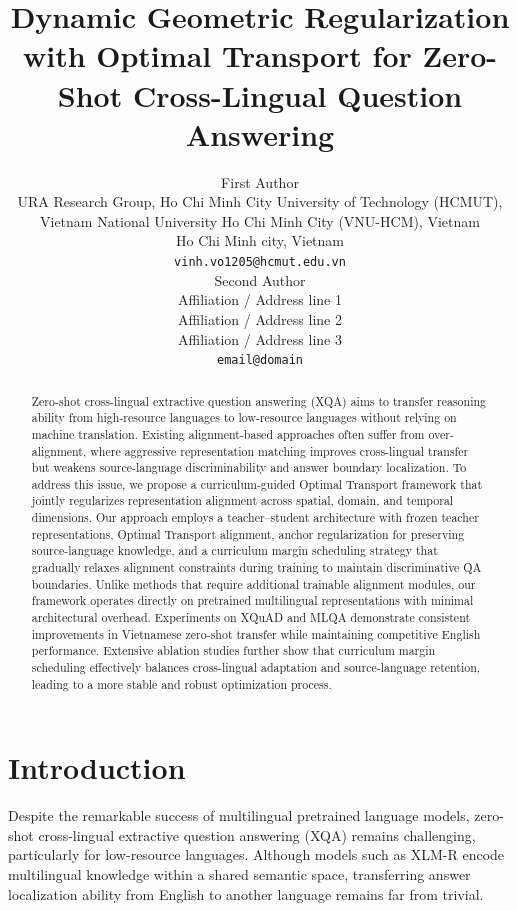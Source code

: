 \documentclass[11pt]{article}
\title{Dynamic Geometric Regularization with Optimal Transport for Zero-Shot Cross-Lingual Question Answering}
\author{First Author \\
  URA Research Group, Ho Chi Minh City University of Technology (HCMUT), Vietnam National University Ho Chi Minh City (VNU-HCM), Vietnam \\
  Ho Chi Minh city, Vietnam \\
  \texttt{vinh.vo1205@hcmut.edu.vn} \\\And
  Second Author \\
  Affiliation / Address line 1 \\
  Affiliation / Address line 2 \\
  Affiliation / Address line 3 \\
  \texttt{email@domain} \\}
\begin{document}
\maketitle
\begin{abstract}

Zero-shot cross-lingual extractive question answering (XQA) aims to transfer reasoning ability from high-resource languages to low-resource languages without relying on machine translation. Existing alignment-based approaches often suffer from over-alignment, where aggressive representation matching improves cross-lingual transfer but weakens source-language discriminability and answer boundary localization. To address this issue, we propose a curriculum-guided Optimal Transport framework that jointly regularizes representation alignment across spatial, domain, and temporal dimensions. Our approach employs a teacher--student architecture with frozen teacher representations, Optimal Transport alignment, anchor regularization for preserving source-language knowledge, and a curriculum margin scheduling strategy that gradually relaxes alignment constraints during training to maintain discriminative QA boundaries. Unlike methods that require additional trainable alignment modules, our framework operates directly on pretrained multilingual representations with minimal architectural overhead. Experiments on XQuAD and MLQA demonstrate consistent improvements in Vietnamese zero-shot transfer while maintaining competitive English performance. Extensive ablation studies further show that curriculum margin scheduling effectively balances cross-lingual adaptation and source-language retention, leading to a more stable and robust optimization process.

\end{abstract}

\section{Introduction}
Despite the remarkable success of multilingual pretrained language models, zero-shot cross-lingual extractive question answering (XQA) remains challenging, particularly for low-resource languages. Although models such as XLM-R encode multilingual knowledge within a shared semantic space, transferring answer localization ability from English to another language remains far from trivial.
\end{document}
